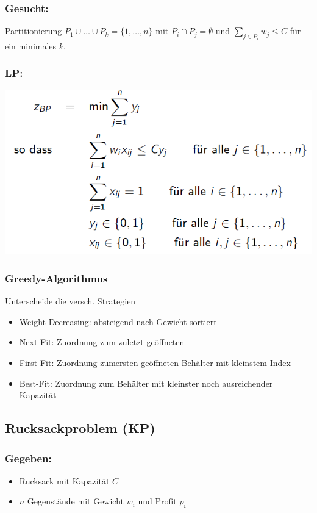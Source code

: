 \documentclass[12pt]{article}
\begin{document}
			\subsubsection*{Gesucht:}
				Partitionierung $P_1\cup\dots\cup P_k = \{1,\dots,n\}$ mit $P_i\cap P_j = \emptyset$ und $\sum_{j\in P_i} w_j \le C$ für ein minimales $k$.
			
			\subsubsection*{LP:}
				\includegraphics*[scale=0.6]{BPLP}

			\subsubsection*{Greedy-Algorithmus}\label{BPGreedy}
			Unterscheide die versch. Strategien
			\begin{itemize}
				\item Weight Decreasing: absteigend nach Gewicht sortiert
				\item Next-Fit: Zuordnung zum zuletzt geöffneten
				\item First-Fit: Zuordnung zumersten geöffneten Behälter mit kleinstem Index
				\item Best-Fit: Zuordnung zum Behälter mit kleinster noch ausreichender Kapazität
			\end{itemize}
		
		\subsection{Rucksackproblem (KP)}
			\subsubsection*{Gegeben:}
			\begin{itemize}
				\item Rucksack mit Kapazität $C$
				\item $n$ Gegenstände mit Gewicht $w_i$ und Profit $p_i$
			\end{itemize}
			
\end{document}
